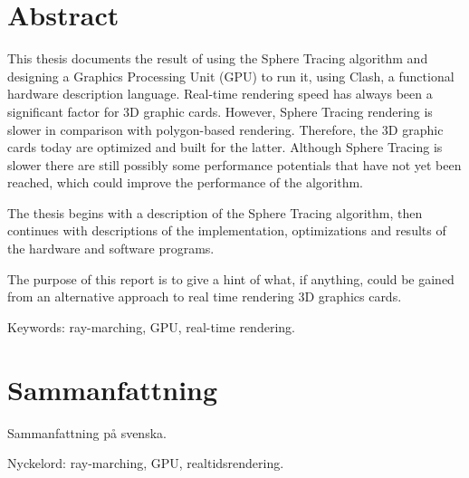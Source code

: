 \thispagestyle{plain}			%
\setlength{\parskip}{0pt plus 1.0pt}
\section*{Abstract}
	
	This thesis documents the result of using the Sphere Tracing algorithm
	and designing a Graphics Processing Unit (GPU) to run it, using Clash,
	a functional hardware description language. Real-time rendering speed has
	always been a significant factor for 3D graphic cards. However, Sphere
	Tracing rendering is slower in comparison with polygon-based rendering. 
	Therefore, the 3D graphic cards today are optimized and built for the latter.
	Although Sphere Tracing is slower there are still possibly some performance potentials
	that have not yet been reached, which could improve the performance of the algorithm.
	
	The thesis begins with a description of the Sphere Tracing algorithm,
	then continues with descriptions of the implementation, optimizations and results of the 
	hardware and software programs. 
	
	The purpose of this report is to give 
	a hint of what, if anything, could be gained from an alternative approach to 
	real time rendering 3D graphics cards.

	\vfill
	Keywords: ray-marching, GPU, real-time rendering.

\newpage
\thispagestyle{plain}

\section*{Sammanfattning}
	
	Sammanfattning på svenska.
	
	\vfill
	Nyckelord: ray-marching, GPU, realtidsrendering.


\newpage
\thispagestyle{empty}
\mbox{}
